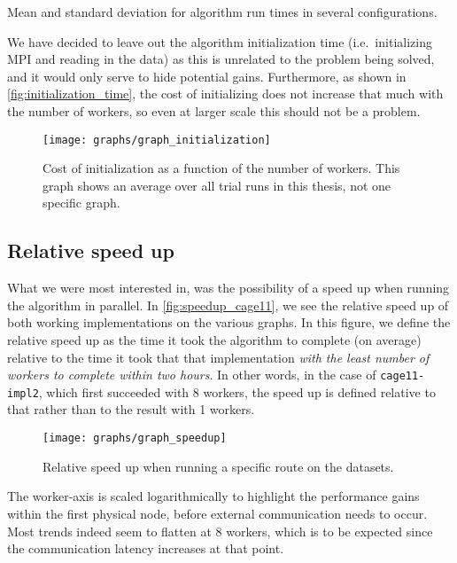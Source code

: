 \begin{table}
    \centering
    
    \caption{Mean and standard deviation for algorithm run times in several configurations.}
    \label{tab:algorithm-runtime}
\end{table}

We have decided to leave out the algorithm initialization time (i.e.\ initializing MPI and reading in the data) as this is unrelated to the problem being solved, and it would only serve to hide potential gains. Furthermore, as shown in \autoref{fig:initialization_time}, the cost of initializing does not increase that much with the number of workers, so even at larger scale this should not be a problem.

\begin{figure}
	\texttt{[image: graphs/graph\_initialization]}
  \caption{Cost of initialization as a function of the number of workers. This graph shows an average over all trial runs in this thesis, not one specific graph.}
  \label{fig:initialization_time}
\end{figure}

\subsection{Relative speed up}
What we were most interested in, was the possibility of a speed up when running the algorithm in parallel. In \autoref{fig:speedup_cage11}, we see the relative speed up of both working implementations on the various graphs. In this figure, we define the relative speed up as the time it took the algorithm to complete (on average) relative to the time it took that that implementation \emph{with the least number of workers to complete within two hours}. In other words, in the case of \texttt{cage11-impl2}, which first succeeded with 8 workers, the speed up is defined relative to that rather than to the result with 1 workers.

\begin{figure}
  \texttt{[image: graphs/graph\_speedup]}
  \caption{Relative speed up when running a specific route on the datasets.}
  \label{fig:speedup_cage11}
\end{figure}

The worker-axis is scaled logarithmically to highlight the performance gains within the first physical node, before external communication needs to occur. Most trends indeed seem to flatten at 8 workers, which is to be expected since the communication latency increases at that point.

